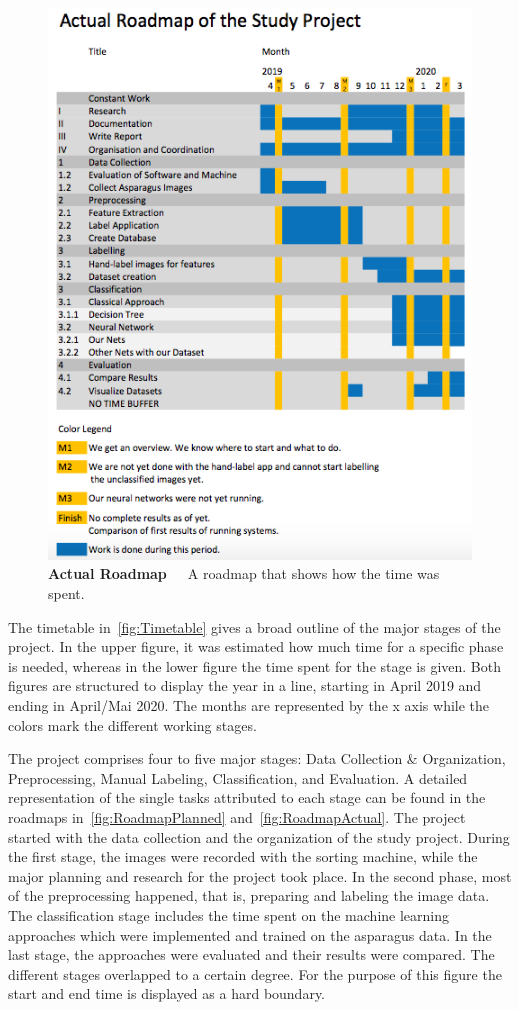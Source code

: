 \begin{figure}[h]
	\centering
	\includegraphics[scale=0.7]{Figures/chapter02/roadmap_actual.png}
	\decoRule
	\caption[Actual Roadmap]{\textbf{Actual Roadmap}~~~A roadmap that shows how the time was spent.}
	\label{fig:RoadmapActual}
\end{figure}

The timetable in~\autoref{fig:Timetable} gives a broad outline of the major stages of the project. In the upper figure, it was estimated how much time for a specific phase is needed, whereas in the lower figure the time spent for the stage is given. Both figures are structured to display the year in a line, starting in April 2019 and ending in April/Mai 2020. The months are represented by the x axis while the colors mark the different working stages.

The project comprises four to five major stages: Data Collection \& Organization, Preprocessing, Manual Labeling, Classification, and Evaluation. A detailed representation of the single tasks attributed to each stage can be found in the roadmaps in~\autoref{fig:RoadmapPlanned} and~\autoref{fig:RoadmapActual}. The project started with the data collection and the organization of the study project. During the first stage, the images were recorded with the sorting machine, while the major planning and research for the project took place. In the second phase, most of the preprocessing happened, that is, preparing and labeling the image data. The classification stage includes the time spent on the machine learning approaches which were implemented and trained on the asparagus data. In the last stage, the approaches were evaluated and their results were compared. The different stages overlapped to a certain degree. For the purpose of this figure the start and end time is displayed as a hard boundary.

